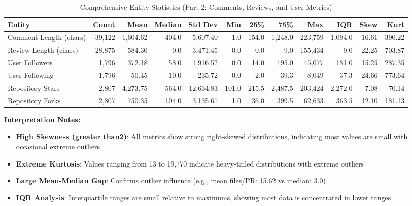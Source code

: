 \documentclass[11pt]{article}
\begin{document}
\begin{table}[H]
\centering
\caption{Comprehensive Entity Statistics (Part 2: Comments, Reviews, and User Metrics)}
\tiny
\begin{tabular}{@{}lrrrrrrrrrrr@{}}
\toprule
\textbf{Entity} & \textbf{Count} & \textbf{Mean} & \textbf{Median} & \textbf{Std Dev} & \textbf{Min} & \textbf{25\%} & \textbf{75\%} & \textbf{Max} & \textbf{IQR} & \textbf{Skew} & \textbf{Kurt} \\
\midrule
Comment Length (chars) & 39,122 & 1,604.62 & 404.0 & 5,607.40 & 1.0 & 154.0 & 1,248.0 & 223,759 & 1,094.0 & 16.61 & 390.22 \\
Review Length (chars) & 28,875 & 584.30 & 0.0 & 3,471.45 & 0.0 & 0.0 & 9.0 & 155,434 & 9.0 & 22.25 & 703.87 \\
User Followers & 1,796 & 372.18 & 58.0 & 1,916.52 & 0.0 & 14.0 & 195.0 & 45,077 & 181.0 & 15.25 & 287.35 \\
User Following & 1,796 & 50.45 & 10.0 & 235.72 & 0.0 & 2.0 & 39.3 & 8,049 & 37.3 & 24.66 & 773.64 \\
Repository Stars & 2,807 & 4,273.75 & 564.0 & 12,634.83 & 101.0 & 215.5 & 2,487.5 & 203,424 & 2,272.0 & 7.08 & 70.14 \\
Repository Forks & 2,807 & 750.35 & 104.0 & 3,135.61 & 1.0 & 36.0 & 399.5 & 62,633 & 363.5 & 12.10 & 181.13 \\
\bottomrule
\end{tabular}
\end{table}

\textbf{Interpretation Notes:}
\begin{itemize}
    \item \textbf{High Skewness (greater than2)}: All metrics show strong right-skewed distributions, indicating most values are small with occasional extreme outliers
    \item \textbf{Extreme Kurtosis}: Values ranging from 13 to 19,770 indicate heavy-tailed distributions with extreme outliers
    \item \textbf{Large Mean-Median Gap}: Confirms outlier influence (e.g., mean files/PR: 15.62 vs median: 3.0)
    \item \textbf{IQR Analysis}: Interquartile ranges are small relative to maximums, showing most data is concentrated in lower ranges
\end{itemize}
\end{document}
